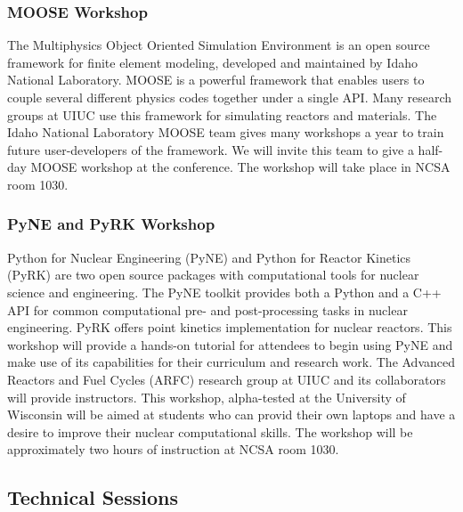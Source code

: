 \subsubsection{MOOSE Workshop}
The Multiphysics Object Oriented Simulation Environment is an open source framework for finite element modeling, developed and maintained by Idaho National Laboratory. MOOSE is a powerful framework that enables users to couple several different physics codes together under a single API. Many research groups at UIUC use this framework for simulating reactors and materials. The Idaho National Laboratory MOOSE team gives many workshops a year to train future user-developers of the framework. We will invite this team to give a half-day MOOSE workshop at the conference. The workshop will take place in NCSA room 1030.

\subsubsection{PyNE and PyRK Workshop}
Python for Nuclear Engineering (PyNE) and Python for Reactor Kinetics (PyRK) are two open source packages with computational tools for nuclear science and engineering. The PyNE toolkit provides both a Python and a C++ API for common computational pre- and post-processing tasks in nuclear engineering. PyRK offers point kinetics implementation for nuclear reactors. This workshop will provide a hands-on tutorial for attendees to begin using PyNE and make use of its capabilities for their curriculum and research work. The Advanced Reactors and Fuel Cycles (ARFC) research group at UIUC and its collaborators will provide instructors. This workshop, alpha-tested at the University of Wisconsin will be aimed at students who can provid their own laptops and have a desire to improve their nuclear computational skills. The workshop will be approximately two hours of instruction at NCSA room 1030.


\subsection{Technical Sessions}

